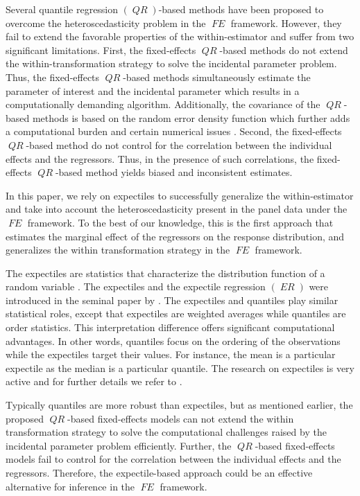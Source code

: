 \documentclass[15pt,a4paper]{article}
\DeclareMathOperator{\ER}{\textit{ER}}
\DeclareMathOperator{\QR}{\textit{QR}}
\DeclareMathOperator{\FE}{\textit{FE}}
\begin{document}
Several quantile regression $(\QR)$-based methods \citep{koenker_quantile_2004, galvao_penalized_2010, lamarcheRobustPenalizedQuantile2010a} have been proposed to overcome the heteroscedasticity problem in the $\FE$ framework. However, they fail to extend the favorable properties of the within-estimator and suffer from two significant limitations. First, the fixed-effects $\QR$-based methods do not extend the within-transformation strategy to solve the incidental parameter problem. Thus, the fixed-effects $\QR$-based methods simultaneously estimate the parameter of interest and the incidental parameter which results in a computationally demanding algorithm. Additionally, the covariance of the $\QR$-based methods is based on the random error density function which further adds a computational burden and certain numerical issues \citep{Chen2004, YinCai2005a, kocherginskyPracticalConfidenceIntervals2005}. Second, the fixed-effects $\QR$-based method do not control for the correlation between the individual effects and the regressors. Thus, in the presence of such correlations, the fixed-effects $\QR$-based method yields biased and inconsistent estimates.

In this paper, we rely on expectiles to successfully generalize the within-estimator and take into account the heteroscedasticity present in the panel data under the $\FE$ framework. To the best of our knowledge, this is the first approach that estimates the marginal effect of the regressors on the response distribution, and generalizes the within transformation strategy in the $\FE$ framework. 


The expectiles are statistics that characterize the distribution function of a random variable \citep{girardFunctionalEstimationExtreme2021}. The expectiles and the expectile regression $(\ER)$ were introduced in the seminal paper by \citet{newey_asymmetric_1987}. The expectiles and quantiles play similar statistical roles, except that expectiles are weighted averages while quantiles are order statistics. This interpretation difference offers significant computational advantages. In other words, quantiles focus on the ordering of the observations while the expectiles target their values. For instance, the mean is a particular expectile as the median is a particular quantile. The research on expectiles is very active and for further details we refer to  \citet{GEEE_Barry2020}.

Typically quantiles are more robust than expectiles, but as mentioned earlier, the proposed $\QR$-based fixed-effects models can not extend the within transformation strategy to solve the computational challenges raised by the incidental parameter problem efficiently. Further, the $\QR$-based fixed-effects models fail to control for the correlation between the individual effects and the regressors. Therefore, the expectile-based approach could be an effective alternative for inference in the $\FE$ framework.  
\end{document}
